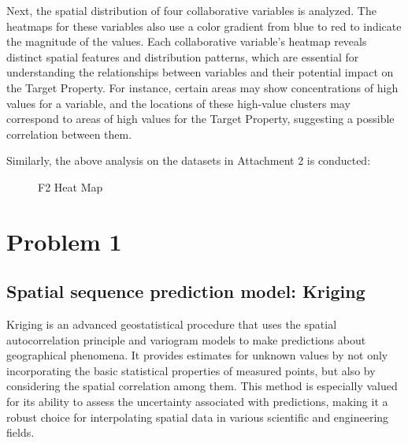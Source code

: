 \documentclass{swmcmthesis}
\begin{document}
Next, the spatial distribution of four collaborative variables is analyzed. The heatmaps for these variables also use a color gradient from blue to red to indicate the magnitude of the values. Each collaborative variable's heatmap reveals distinct spatial features and distribution patterns, which are essential for understanding the relationships between variables and their potential impact on the Target Property. For instance, certain areas may show concentrations of high values for a variable, and the locations of these high-value clusters may correspond to areas of high values for the Target Property, suggesting a possible correlation between them.

Similarly, the above analysis on the datasets in Attachment 2 is conducted:

\begin{figure}[h!t]
\centering
{}\hfill
{}
\caption{F2 Heat Map}
\end{figure}


\section{Problem 1}
\subsection{Spatial sequence prediction model: Kriging}
Kriging is an advanced geostatistical procedure that uses the spatial autocorrelation principle and variogram models to make predictions about geographical phenomena. It provides estimates for unknown values by not only incorporating the basic statistical properties of measured points, but also by considering the spatial correlation among them. This method is especially valued for its ability to assess the uncertainty associated with predictions, making it a robust choice for interpolating spatial data in various scientific and engineering fields.\cite{bib5}
\end{document}
